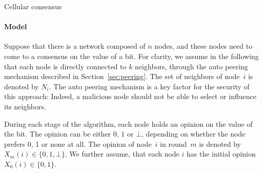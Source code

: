 \documentclass[../main.tex]{subfiles}
\begin{document}
\begin{algorithm}[h]
	\DontPrintSemicolon
			
	\BlankLine
			
	\caption{Cellular consensus}
	\label{alg:cell}
\end{algorithm}

\paragraph{Model}

Suppose that there is a network composed of $n$ nodes, and these nodes need to come to a consensus on the value of a bit.
For clarity, we assume in the following that each node is directly connected to $k$ neighbors, through the auto peering mechanism described in Section~\ref{sec:peering}.
The set of neighbors of node~$i$ is denoted by $N_i$.
The auto peering mechanism is a key factor for the security of this approach: Indeed, a malicious node should not be able to select or influence its neighbors.

During each stage of the algorithm, each node holds an opinion on the value of the bit.
The opinion can be either $0$, $1$ or $\bot$, depending on whether the node prefers 0, 1 or none at all.
The opinion of node~$i$ in round~$m$ is denoted by~$X_m(i) \in \{0,1, \bot\}$. 
We further assume, that each node $i$ has the initial opinion $X_0(i) \in \{0,1\}$.
\end{document}

